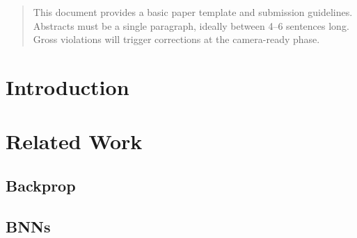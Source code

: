 \documentclass{article}
\begin{document}
\printAffiliationsAndNotice{\icmlEqualContribution} %

\begin{abstract}
This document provides a basic paper template and submission guidelines.
Abstracts must be a single paragraph, ideally between 4--6 sentences long.
Gross violations will trigger corrections at the camera-ready phase.
\end{abstract}

\section{Introduction}\label{sec:intro}

\section{Related Work}\label{sec:related_work}
\subsection{Backprop}\label{sub:backprop}

\subsection{BNNs}\label{sub:nn}
\end{document}
